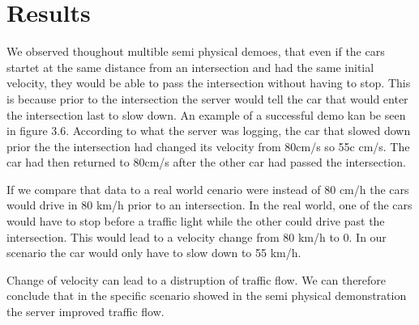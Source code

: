 \section{Results}

We observed thoughout multible semi physical demoes, that even if the cars startet at the same distance from an intersection and had the same initial velocity, they would be able to pass the intersection without having to stop. This is because prior to the intersection the server would tell the car that would enter the intersection last to slow down. An example of a successful demo kan be seen in figure 3.6. According to what the server was logging, the car that slowed down prior the the intersection had changed its velocity from 80cm/s so 55c cm/s. The car had then returned to 80cm/s after the other car had passed the intersection.

If we compare that data to a real world cenario were instead of 80 cm/h the cars would drive in 80 km/h prior to an intersection. In the real world, one of the cars would have to stop before a traffic light while the other could drive past the intersection. This would lead to a velocity change from 80 km/h to 0. In our scenario the car would only have to slow down to 55 km/h.

Change of velocity can lead to a distruption of traffic flow. We can  therefore conclude that in the specific scenario showed in the semi physical demonstration the server improved traffic flow.   



